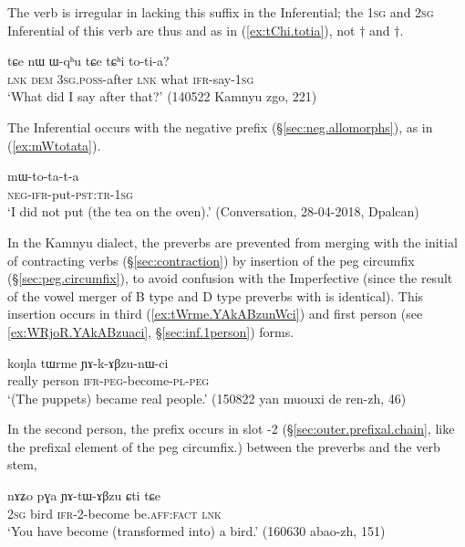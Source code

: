 The verb  is irregular in lacking this suffix in the Inferential; the \textsc{1sg} and \textsc{2sg} Inferential of this verb are thus  and  as in (\ref{ex:tChi.totia}), not $\dagger$ and $\dagger$.

\begin{exe}
\ex \label{ex:tChi.totia}
\gll tɕe nɯ ɯ-qʰu tɕe tɕʰi to-ti-a? \\
\textsc{lnk} \textsc{dem} \textsc{3sg}.\textsc{poss}-after \textsc{lnk} what \textsc{ifr}-say-\textsc{1sg} \\
\glt `What did I say after that?' (140522 Kamnyu zgo, 221)
\end{exe}

The Inferential occurs with the negative prefix  (§\ref{sec:neg.allomorphs}), as in (\ref{ex:mWtotata}).

\begin{exe}
\ex \label{ex:mWtotata}
\gll mɯ-to-ta-t-a \\
\textsc{neg}-\textsc{ifr}-put-\textsc{pst}:\textsc{tr}-\textsc{1sg} \\
\glt `I did not put (the tea on the oven).' (Conversation, 28-04-2018, Dpalcan)
\end{exe}

In the Kamnyu dialect, the preverbs are prevented from merging with the initial  of contracting verbs (§\ref{sec:contraction}) by insertion of the peg circumfix (§\ref{sec:peg.circumfix}), to avoid confusion with the Imperfective (since the result of the vowel merger of B type and D type preverbs with  is identical). This insertion occurs in third (\ref{ex:tWrme.YAkABzunWci}) and first person (see \ref{ex:WRjoR.YAkABzuaci}, §\ref{sec:inf.1person}) forms.


\begin{exe}
\ex \label{ex:tWrme.YAkABzunWci}
\gll koŋla tɯrme ɲɤ-k-ɤβzu-nɯ-ci \\
really person \textsc{ifr}-\textsc{peg}-become-\textsc{pl}-\textsc{peg} \\
\glt `(The puppets) became real people.' (150822 yan muouxi de ren-zh, 46)
\end{exe}

In the second person, the prefix  occurs in slot -2 (§\ref{sec:outer.prefixal.chain}, like the prefixal element  of the peg circumfix.) between the preverbs and the verb stem, 

\begin{exe}
\ex \label{ex:pGa.YAtABzu}
\gll nɤʑo pɣa ɲɤ-tɯ-ɤβzu ɕti tɕe \\
\textsc{2sg} bird \textsc{ifr}-2-become be.\textsc{aff}:\textsc{fact} \textsc{lnk} \\
\glt `You have become (transformed into) a bird.' (160630 abao-zh, 151)
\end{exe}

